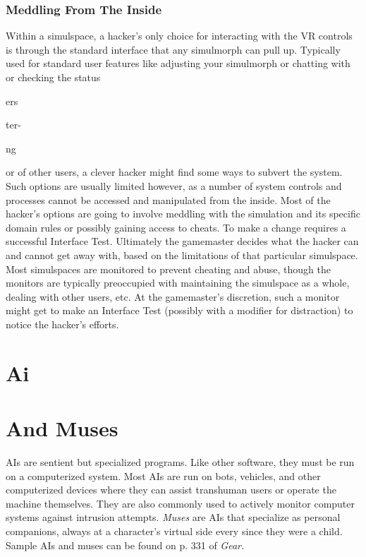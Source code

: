 \subsubsection{Meddling From The Inside}

Within a simulspace, a hacker's only choice for interacting
with the VR controls is through the standard
interface that any simulmorph can pull up. Typically 
used for standard user features like adjusting your 
simulmorph or chatting with or checking the status 

ers

ter-

ng 

or
of other users, a clever hacker might find some ways 
to subvert the system. Such options are usually limited
however, as a number of system controls and
processes cannot be accessed and manipulated from 
the inside.
Most of the hacker's options are going to involve 
meddling with the simulation and its specific domain 
rules or possibly gaining access to cheats. To make a 
change requires a successful Interface Test. Ultimately 
the gamemaster decides what the hacker can and 
cannot get away with, based on the limitations of that 
particular simulspace.
Most simulspaces are monitored to prevent cheating
and abuse, though the monitors are typically preoccupied
with maintaining the simulspace as a whole,
dealing with other users, etc. At the gamemaster's 
discretion, such a monitor might get to make an Interface
Test (possibly with a modifier for distraction) to
notice the hacker's efforts.

\section{Ai}


\section{ And Muses}

AIs are sentient but specialized programs. Like other 
software, they must be run on a computerized system. 
Most AIs are run on bots, vehicles, and other computerized
devices where they can assist transhuman
users or operate the machine themselves. They are also 
commonly used to actively monitor computer systems 
against intrusion attempts. \textit{Muses} are AIs that specialize
as personal companions, always at a character's
virtual side every since they were a child.
Sample AIs and muses can be found on p. 331 of \textit{Gear.}

